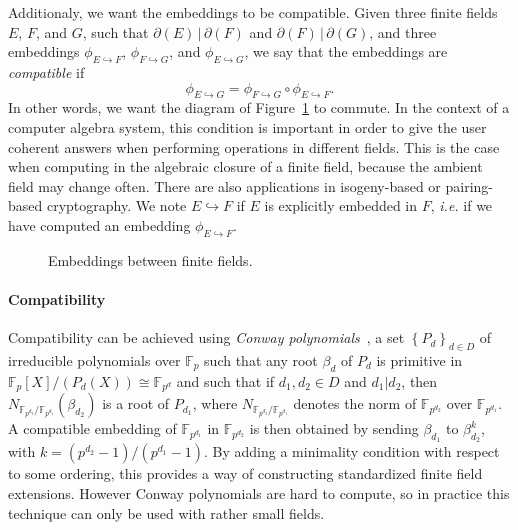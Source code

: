 \documentclass[12pt]{article}
\newcommand{\dE}{\partial(E)}
\newcommand{\dF}{\partial(F)}
\newcommand{\dG}{\partial(G)}
\newcommand{\emb}{\hookrightarrow}
\newcommand{\embed}[2]{\phi_{#1\hookrightarrow#2}}
\newcommand{\ie}{\emph{i.e. }}
\begin{document}
Additionaly, we want the embeddings to be compatible. Given three finite 
fields $E$, $F$, and $G$, such that $\dE\,|\,\dF$ and $\dF\,|\,\dG$, and three 
embeddings $\embed{E}{F}$, $\embed{F}{G}$, and $\embed{E}{G}$, we say that the
embeddings are \emph{compatible} if 
\[
  \embed{E}{G}=\embed{F}{G}\circ\embed{E}{F}.
\]
In other words, we want the diagram of Figure~\ref{fig:compatibility} to
commute. In the context of a computer algebra system, this condition is
important in order to give the user coherent answers when performing operations
in different fields. This is the case when computing in the algebraic closure of a
finite field, because the ambient field may change often. There are also
applications in isogeny-based or pairing-based cryptography.
We note $E\emb F$ if $E$ is explicitly embedded in $F$, \ie if
we have computed an embedding $\embed{E}{F}$.
\begin{figure}
  \centering

  \caption{Embeddings between finite fields.}
  \label{fig:compatibility}
\end{figure}

\paragraph{Compatibility}

Compatibility can be achieved using \emph{Conway polynomials}~\cite{Parker90, HL98}, a set $\left\{
P_d \right\}_{d\in D}$ of
irreducible polynomials over $\mathbb{F}_p$ such that any root $\beta_d$ of
$P_d$ is primitive in $\mathbb{F}_{p}[X]/(P_d(X))\cong \mathbb{F}_{p^d}$ and
such that if $d_1, d_2\in D$ and $d_1|d_2$, then
$N_{\mathbb{F}_{p^{d_2}}/\mathbb{F}_{p^{d_1}}}(\beta_{d_2})$ is a root of
$P_{d_1}$, where $N_{\mathbb{F}_{p^{d_2}}/\mathbb{F}_{p^{d_1}}}$ denotes
the norm of $\mathbb{F}_{p^{d_2}}$ over $\mathbb{F}_{p^{d_1}}$. A compatible
embedding of $\mathbb{F}_{p^{d_1}}$ in $\mathbb{F}_{p^{d_2}}$ is then obtained
by sending $\beta_{d_1}$ to $\beta_{d_2}^k$, with $k=(p^{d_2}-1)/(p^{d_1}-1)$.
By adding a minimality condition with respect to some ordering, this provides a
way of constructing standardized finite field extensions. However Conway polynomials
are hard to compute, so in practice this technique can only be used with rather
small fields.
\end{document}
